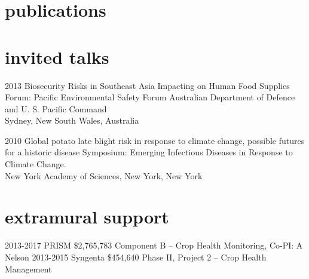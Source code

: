 \documentclass[]{friggeri-cv}
\begin{document}



\section{publications}

\begin{refsection}
  \nocite{*}
  \printbibliography[sorting=chronological, type=inreview, title={in review}, heading=subbibliography]
\end{refsection}
\begin{refsection}
  \nocite{*}
  \printbibliography[sorting=chronological, type=inproceedings, title={conferences/proceedings},  heading=subbibliography]
\end{refsection}
\begin{refsection}
  \nocite{*}
  \printbibliography[sorting=chronological, type=inbook, title={book chapters}, heading=subbibliography]
\end{refsection}
\begin{refsection}
  \nocite{*}
  \printbibliography[sorting=chronological, type=report, title={reports}, heading=subbibliography]
\end{refsection}

\section{invited talks}
\begin{entrylist}
\entry
{2013}
{Biosecurity Risks in Southeast Asia Impacting on Human Food Supplies}
{}
{Forum: Pacific Environmental Safety Forum Australian Department of Defence and U. S. Pacific Command\\Sydney, New South Wales, Australia}

\entry
{2010} 
{Global potato late blight risk in response to climate change, possible futures for a historic disease}
{}
{Symposium: Emerging Infectious Diseases in Response to Climate Change.\\New York Academy of Sciences, New York, New York}
\end{entrylist}

\section{extramural support}
  \begin{entrylist}
  \entry
	{2013-2017}
	{PRISM }
	{\$2,765,783}
	{Component B -- Crop Health Monitoring, Co-PI: A Nelson}
  \entry
	{2013-2015}
	{Syngenta}
	{\$454,640}
	{Phase II, Project 2 -- Crop Health Management}
  \end{entrylist}


\end{document}

